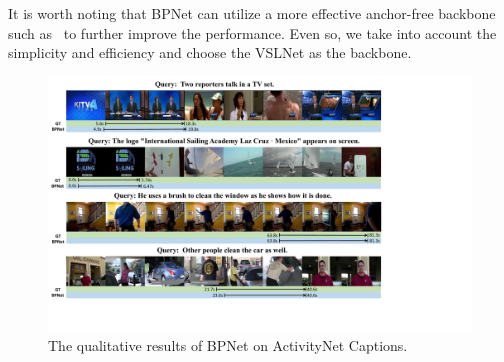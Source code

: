 \documentclass[letterpaper]{article} %
\begin{document}
It is worth noting that BPNet can utilize a more effective anchor-free backbone 
such as~\cite{DBLP:conf/aaai/ZhangPFL20,DBLP:conf/cvpr/ZengXHCTG20} to further improve the performance. 
Even so, we take into account the simplicity and efficiency and choose the VSLNet as the backbone. 

\begin{figure}
    \centering
    \includegraphics[height=0.46\textheight,width=\textwidth]{figure4_1_cut.pdf}
    \caption{The qualitative results of BPNet on ActivityNet Captions.}
    \label{figure4}
\end{figure}
\end{document}
